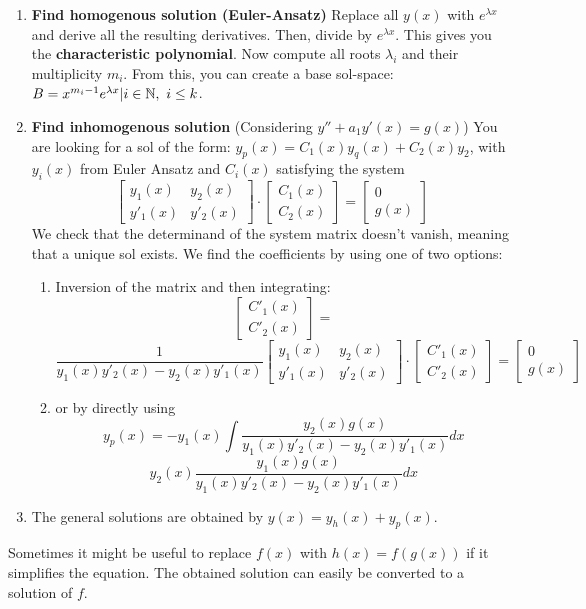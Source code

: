 \begin{concept}
	\begin{enumerate}
		\item \textbf{Find homogenous solution (Euler-Ansatz)}
			Replace all $y(x)$ with $e^{\lambda x}$ and derive all the resulting derivatives.
			Then, divide by $e^{\lambda x}$. This gives you the \textbf{characteristic polynomial}.
			Now compute all roots $\lambda_i$ and their multiplicity $m_i$.
			From this, you can create a  base sol-space: $B = {x^{m_i-1}e^{\lambda x} | i \in \mathbb{N}, \ i \leq k}$.
		\item \textbf{Find inhomogenous solution}
			(Considering $y''+a_1y'(x) = g(x)$)
			You are looking for a sol of the form: $y_p(x) = C_1(x)y_q(x) + C_2(x)y_2$, with $y_i(x)$ from Euler Ansatz and $C_i(x)$ satisfying the system 
			$$\begin{bmatrix} y_1(x) & y_2(x) \\ y'_1(x) &  y'_2(x)\end{bmatrix} \cdot \begin{bmatrix}C_1(x) \\  C_2(x)\end{bmatrix} = \begin{bmatrix}0 \\ g(x)\end{bmatrix}$$
			We check that the determinand of the system matrix doesn't vanish, meaning that a unique sol exists.
			We find the coefficients by using one of two options:	
			\begin{enumerate}
				\item Inversion of the matrix and then integrating:
					$$\begin{bmatrix} C'_1(x) \\ C'_2(x)\end{bmatrix} = $$ $$\frac{1}{y_1(x)y'_2(x) - y_2(x)y'_1(x)}\begin{bmatrix} y_1(x) & y_2(x) \\ y'_1(x) & y'_2(x) \end{bmatrix} \cdot \begin{bmatrix}C'_1(x) \\ C'_2(x) \end{bmatrix} = \begin{bmatrix} 0 \\ g(x) \end{bmatrix}$$
				\item or by directly using
					$$y_p(x) = -y_1(x) \int \frac{y_2(x)g(x)}{y_1(x)y'_2(x) - y_2(x)y'_1(x)}dx $$ $$ y_2(x) \frac{y_1(x)g(x)}{y_1(x)y'_2(x) - y_2(x)y'_1(x)}dx$$
			\end{enumerate}
		\item The general solutions are obtained by $y(x) = y_h(x) + y_p(x)$.
	\end{enumerate}
\end{concept}

\begin{remark}
	Sometimes it might be useful to replace $f(x)$ with $h(x) = f(g(x))$ if it simplifies the equation.
	The obtained solution can easily be converted to a solution of $f$.
\end{remark}

